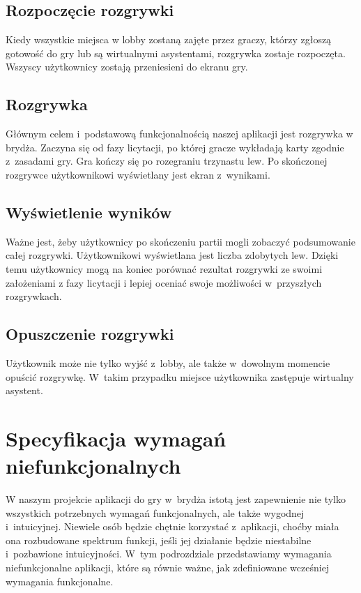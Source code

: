 \subsection{Rozpoczęcie rozgrywki}
Kiedy wszystkie miejsca w lobby zostaną zajęte przez graczy, którzy zgłoszą gotowość do gry
lub są wirtualnymi asystentami, rozgrywka zostaje rozpoczęta.
Wszyscy użytkownicy zostają przeniesieni do ekranu gry.


\subsection{Rozgrywka}
Głównym celem i~podstawową funkcjonalnością naszej aplikacji jest
rozgrywka w brydża. Zaczyna się od fazy licytacji, po której
gracze wykładają karty zgodnie z~zasadami gry. Gra kończy się po rozegraniu 
trzynastu lew. Po skończonej rozgrywce użytkownikowi wyświetlany jest ekran z~wynikami.

\subsection{Wyświetlenie wyników}
Ważne jest, żeby użytkownicy po skończeniu partii mogli zobaczyć
podsumowanie całej rozgrywki. Użytkownikowi wyświetlana jest liczba 
zdobytych lew. Dzięki temu użytkownicy mogą na koniec porównać rezultat rozgrywki 
ze swoimi założeniami z fazy licytacji i lepiej oceniać swoje możliwości w~przyszłych rozgrywkach.


\subsection{Opuszczenie rozgrywki}
Użytkownik może nie tylko wyjść z~lobby, ale także w~dowolnym momencie
opuścić rozgrywkę. W~takim przypadku miejsce użytkownika zastępuje
wirtualny asystent.




\section{Specyfikacja wymagań niefunkcjonalnych}
W naszym projekcie aplikacji do gry w~brydża
istotą jest zapewnienie nie tylko wszystkich potrzebnych wymagań
funkcjonalnych, ale także wygodnej i~intuicyjnej. Niewiele osób
będzie chętnie korzystać z~aplikacji, choćby miała ona rozbudowane
spektrum funkcji, jeśli jej działanie będzie niestabilne i~pozbawione
intuicyjności. W~tym podrozdziale przedstawiamy wymagania
niefunkcjonalne aplikacji, które są równie ważne, jak zdefiniowane
wcześniej wymagania funkcjonalne.


